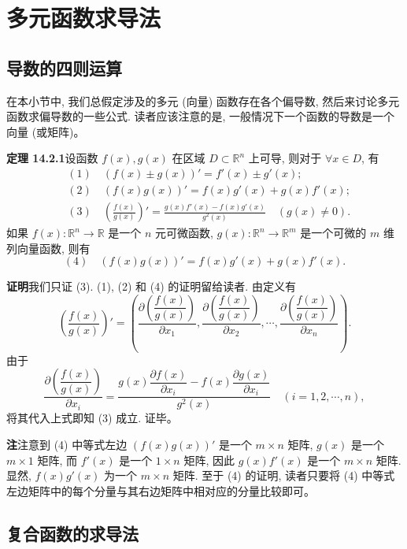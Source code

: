 \documentclass[UTF8, 12pt, fontset=fandol, oneside]{ctexart}
\begin{document}
\section{多元函数求导法}

\subsection{导数的四则运算}

在本小节中, 我们总假定涉及的多元 (向量) 函数存在各个偏导数, 然后来讨论多元函数求偏导数的一些公式. 读者应该注意的是, 一般情况下一个函数的导数是一个向量 (或矩阵)。

\noindent\textbf{定理 14.2.1}\quad 设函数 $f(x),g(x)$ 在区域 $D\subset\mathbb R^n$ 上可导, 则对于 $\forall x\in D$, 有
\[
\begin{aligned}
  &(1)\quad (f(x)\pm g(x))'=f'(x)\pm g'(x);\\
  &(2)\quad (f(x)g(x))'=f(x)g'(x)+g(x)f'(x);\\
  &(3)\quad \left(\frac{f(x)}{g(x)}\right)'=
  \frac{g(x)f'(x)-f(x)g'(x)}{g^2(x)}\quad (g(x)\ne0).
\end{aligned}
\]
如果 $f(x):\mathbb R^n\to\mathbb R$ 是一个 $n$ 元可微函数, $g(x):\mathbb R^n\to\mathbb R^m$ 是一个可微的 $m$ 维列向量函数, 则有
\[
  (4)\quad (f(x)g(x))'=f(x)g'(x)+g(x)f'(x).
\]

\noindent\textbf{证明}\quad 我们只证 (3). (1), (2) 和 (4) 的证明留给读者. 由定义有
\[
  \left(\frac{f(x)}{g(x)}\right)'=
  \left(
    \frac{\partial\left(\dfrac{f(x)}{g(x)}\right)}{\partial x_1},
    \frac{\partial\left(\dfrac{f(x)}{g(x)}\right)}{\partial x_2},
    \cdots,
    \frac{\partial\left(\dfrac{f(x)}{g(x)}\right)}{\partial x_n}
  \right).
\]
由于
\[
  \frac{\partial\left(\dfrac{f(x)}{g(x)}\right)}{\partial x_i}
  =
  \frac{g(x)\dfrac{\partial f(x)}{\partial x_i}-f(x)\dfrac{\partial g(x)}{\partial x_i}}{g^2(x)}
  \quad (i=1,2,\cdots,n),
\]
将其代入上式即知 (3) 成立. 证毕。

\noindent\textbf{注}\quad 注意到 (4) 中等式左边 $(f(x)g(x))'$ 是一个 $m\times n$ 矩阵, $g(x)$ 是一个 $m\times1$ 矩阵, 而 $f'(x)$ 是一个 $1\times n$ 矩阵, 因此 $g(x)f'(x)$ 是一个 $m\times n$ 矩阵. 显然, $f(x)g'(x)$ 为一个 $m\times n$ 矩阵. 至于 (4) 的证明, 读者只要将 (4) 中等式左边矩阵中的每个分量与其右边矩阵中相对应的分量比较即可。

\subsection{复合函数的求导法}
\end{document}

